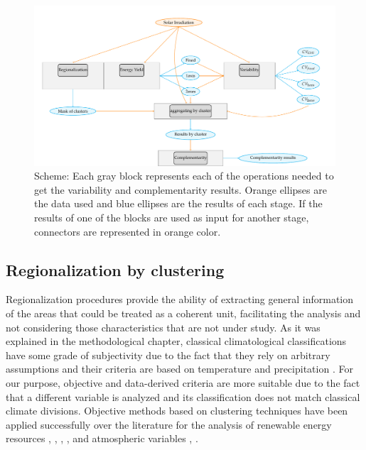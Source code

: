 \begin{figure}[h!]
\centering\includegraphics[width=1\textwidth]{figs/capitulo5/multi_step}
\caption[Stages of the multi-step scheme for variability and complementarity analysis]{Scheme: Each gray block represents each of the operations needed to get the variability and complementarity results. Orange ellipses are the data used and blue ellipses are the results of each stage. If the results of one of the blocks are used as input for another stage, connectors are represented in orange color.}
\label{fig:multi_step}
\end{figure}

\subsection{Regionalization by clustering}

Regionalization procedures provide the ability of extracting general information of the areas that could be treated as a coherent unit, facilitating the analysis and not considering those characteristics that are not under study. As it was explained in the methodological chapter, classical climatological classifications have some grade of subjectivity due to the fact that they rely on arbitrary assumptions \cite*{Kottek2006} and their criteria are based on temperature and precipitation \cite*{trewartha1980koppen}. For our purpose, objective and data-derived criteria are more suitable due to the fact that a different variable is analyzed and its classification does not match classical climate divisions. Objective methods based on clustering techniques have been applied successfully over the literature for the analysis of renewable energy resources \cite*{Polo2015}, \cite*{Zagouras2013}, \cite*{Zagouras2014}, \cite*{Zagouras2014b}, \cite*{gomez2015characterization} and atmospheric variables \cite*{Argueso2011}, \cite*{garcia2012seasonal}. 

